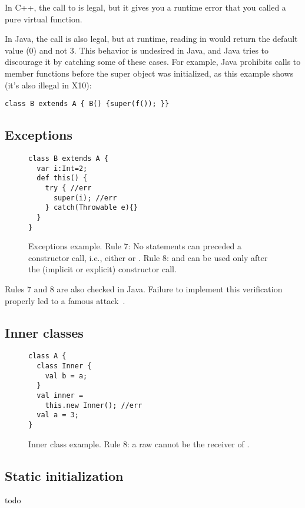 In C++, the call to  is legal, but it gives you a runtime error
    that you called a pure virtual function.

In Java, the call is also legal, but at runtime,
    reading  in  would return the default value (0) and not 3.
This behavior is undesired in Java, and Java tries to discourage it by catching some of these cases.
For example, Java prohibits calls to member functions before the super object was initialized,
    as this example shows (it's also illegal in X10):
\begin{lstlisting}
class B extends A { B() {super(f()); }}
\end{lstlisting}



\subsection{Exceptions}


\begin{figure}
\begin{lstlisting}
class B extends A {
  var i:Int=2;
  def this() {
    try { //err
      super(i); //err
    } catch(Throwable e){}
  }
}
\end{lstlisting}
\caption{Exceptions example.
    Rule 7: No statements can preceded a constructor call, i.e., either  or .
    Rule 8: \this and  can be used only after the (implicit or explicit) constructor call.}
\label{Figure:Exceptions}
\end{figure}

Rules 7 and 8 are also checked in Java.
Failure to implement this verification properly led to a famous attack~\cite{Dean:1996}.


\subsection{Inner classes}
\begin{figure}
\begin{lstlisting}
class A {
  class Inner {
    val b = a;
  }
  val inner =
    this.new Inner(); //err
  val a = 3;
}
\end{lstlisting}
\caption{Inner class example.
    Rule 8: a raw \this cannot be the receiver of .}
\label{Figure:InnerClass}
\end{figure}


\subsection{Static initialization}
todo

